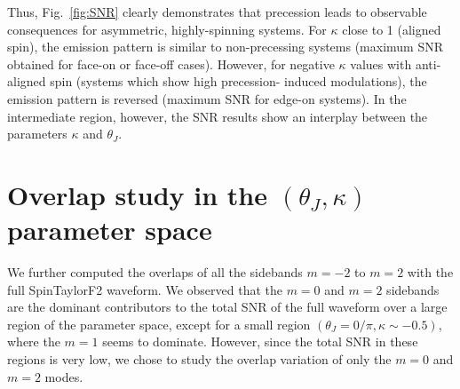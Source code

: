 Thus, Fig.~\ref{fig:SNR} clearly demonstrates that precession leads to
observable consequences for asymmetric, highly-spinning systems. For $\kappa$
close to 1 (aligned spin), the emission pattern is similar to non-precessing
systems (maximum SNR obtained for face-on or face-off cases). However, for
negative $\kappa$ values with anti-aligned spin (systems which show high
precession- induced modulations), the emission pattern is reversed (maximum
SNR for edge-on systems). In the intermediate region, however, the SNR results show an
interplay between the parameters $\kappa$ and $\theta_J$.

\section{Overlap study in the $(\theta_J, \kappa)$ parameter space}
We further computed the overlaps of all the sidebands $m=-2$ to $m=2$ with the
full SpinTaylorF2 waveform. We observed that the $m=0$ and  $m=2$ sidebands
are the dominant contributors to the total SNR of the full waveform over a
large region of the parameter space, except for a small region
$(\theta_J=0/\pi, \kappa \sim -0.5)$, where the $m=1$ seems to dominate.
However, since the total SNR in these regions is very low, we chose to study
the overlap variation of only the $m=0$ and  $m=2$ modes.

